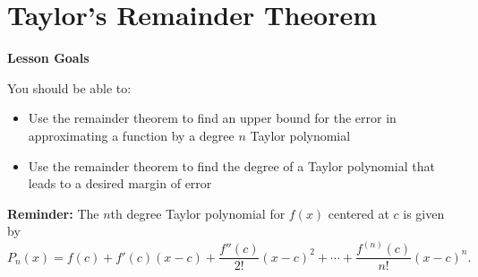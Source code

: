\documentclass[main]{subfiles}
\begin{document}
\ifSubfilesClassLoaded{%
  \chaptermark{\chaptertwo}
}{}

\section{Taylor's Remainder Theorem} \label{ws2-3}

\begin{framed}
\centerline{\textbf{Lesson Goals}}

You should be able to:
\begin{itemize}

\item Use the remainder theorem to find an upper bound for the error in approximating a function by a degree $n$ Taylor polynomial
\item Use the remainder theorem to find the degree of a Taylor polynomial that leads to a desired margin of error
\end{itemize}
\end{framed}



 \begin{problemonly} 
    \begin{framed}
    \textbf{Reminder:} The $n$th degree Taylor polynomial for $f(x)$ centered at $c$ is given by
    $$
      P_{n}(x) = f(c) + f'(c)(x-c) + \frac{f''(c)}{2!}(x-c)^{2} + \cdots + \frac{f^{(n)}(c)}{n!}(x-c)^{n}.
    $$
    \end{framed}
  \end{problemonly}
\end{document}
